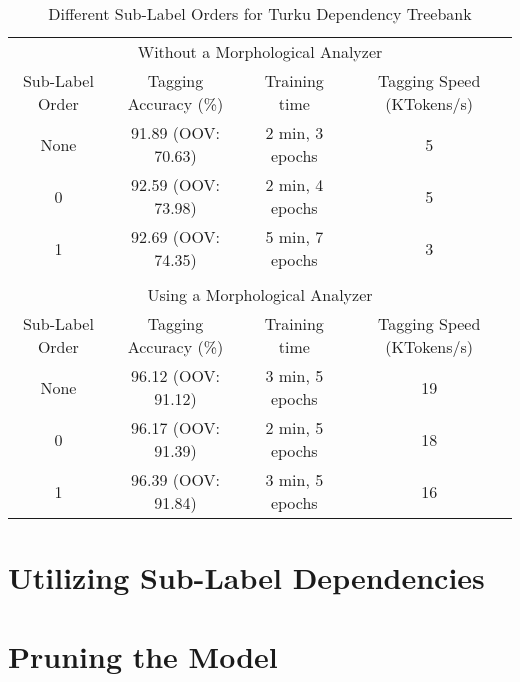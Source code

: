 \begin{table}[htb!]
\begin{center}
\begin{tabular}{cccc}
\multicolumn{4}{c}{Without a Morphological Analyzer}\\
Sub-Label Order & Tagging Accuracy (\%) & Training time    & Tagging Speed (KTokens/s)\\
\hline
None            & 91.89 (OOV: 70.63)    & 2 min, 3 epochs  & 5                       \\
0               &  92.59 (OOV: 73.98)   & 2 min, 4 epochs  & 5                       \\
1               &  92.69 (OOV: 74.35)   & 5 min, 7 epochs  & 3                       \\
\hline
                &                       &                  &                          \\
\multicolumn{4}{c}{Using a Morphological Analyzer}\\
Sub-Label Order & Tagging Accuracy (\%) & Training time    & Tagging Speed (KTokens/s)\\
\hline
None            &  96.12 (OOV: 91.12)   & 3 min, 5 epochs  & 19                       \\
0               &  96.17 (OOV: 91.39)   & 2 min, 5 epochs  & 18                       \\
1               &  96.39 (OOV: 91.84)   & 3 min, 5 epochs  & 16                       \\
\end{tabular}
\caption{Different Sub-Label Orders for Turku Dependency Treebank}
\end{center}
\end{table}

\section{Utilizing Sub-Label Dependencies}

\section{Pruning the Model}

